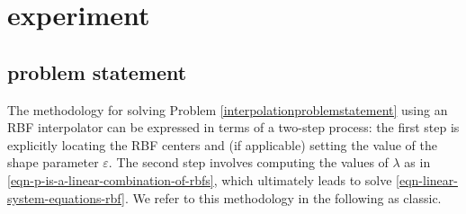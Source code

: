 \documentclass[12pt]{report} %
\begin{document}


\section{experiment}

\subsection*{problem statement}

The methodology for solving Problem \ref{interpolationproblemstatement} using an RBF interpolator can be expressed in terms of a two-step process: the first step is explicitly locating the RBF centers and (if applicable) setting the value of the shape parameter $\varepsilon$. The second step involves computing the values of $\lambda$ as in \eqref{eqn-p-is-a-linear-combination-of-rbfs}, which ultimately leads to solve \eqref{eqn-linear-system-equations-rbf}. We refer to this methodology in the following as classic.
\end{document}
